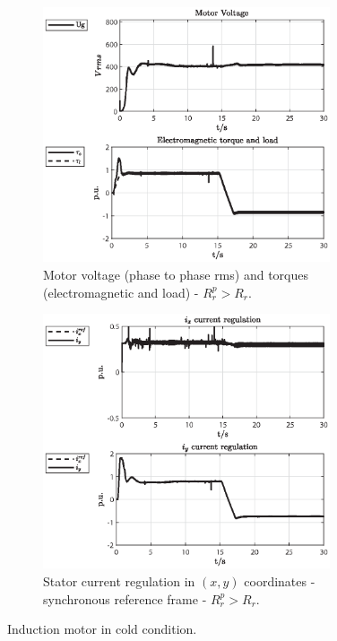 \documentclass[11pt,a4paper,oneside]{book}
\numberwithin{equation}{section}
\theoremstyle{it}
\theoremstyle{definition}
\begin{document}
\begin{figure}[H]
	\centering
	\begin{subfigure}{0.5\textwidth}
	\centering
	\includegraphics[width = 240pt, keepaspectratio]{figures/sim_results/cold_condition/motor_voltage.eps}
	\captionsetup{width=0.65\textwidth, font=footnotesize}	
	\caption{Motor voltage (phase to phase rms) and torques (electromagnetic and load) - $R_r^p > R_r$.}
	\label{fig_sim_res_21}
	\end{subfigure}%
	\begin{subfigure}{0.5\textwidth}
	\centering
	\includegraphics[width = 240pt, keepaspectratio]{figures/sim_results/cold_condition/current_reg.eps}
	\captionsetup{width=0.65\textwidth, font=footnotesize}	
	\caption{Stator current regulation in $(x,y)$ coordinates - synchronous reference frame - $R_r^p > R_r$.}
	\label{fig_sim_res_22}
	\end{subfigure}		
	\captionsetup{width=0.5\textwidth, font=small}	
	\caption{Induction motor in cold condition.}
	\label{}
\end{figure}
\end{document}
